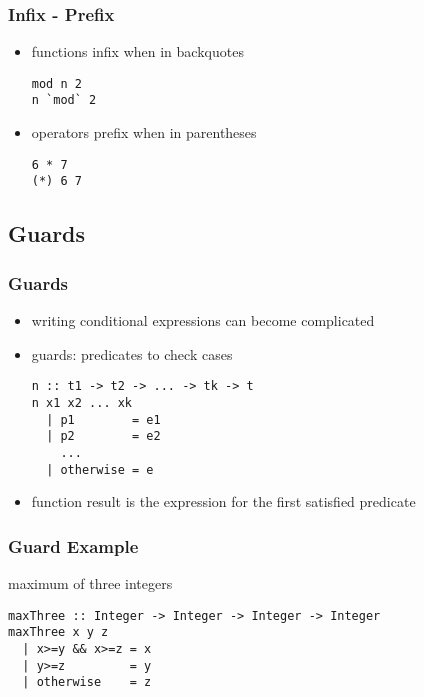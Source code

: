 \documentclass[dvipsnames]{beamer}
\theoremstyle{plain}
\begin{document}
\begin{frame}[fragile]
  \frametitle{Infix - Prefix}

  \begin{itemize}
    \item functions infix when in backquotes
    \begin{lstlisting}
mod n 2
n `mod` 2
    \end{lstlisting}

    \pause
    \medskip
    \item operators prefix when in parentheses
    \begin{lstlisting}
6 * 7
(*) 6 7
    \end{lstlisting}
  \end{itemize}
\end{frame}

\subsection{Guards}

\begin{frame}[fragile]
  \frametitle{Guards}

  \begin{itemize}
    \item writing conditional expressions can become complicated
    \item \alert{guards}: predicates to check cases

    \begin{lstlisting}[style=syntax]
n :: t1 -> t2 -> ... -> tk -> t
n x1 x2 ... xk
  | p1        = e1
  | p2        = e2
    ...
  | otherwise = e
    \end{lstlisting}

    \item function result is the expression for the first satisfied predicate
  \end{itemize}
\end{frame}

\begin{frame}[fragile]
  \frametitle{Guard Example}

  \begin{exampleblock}{maximum of three integers}
    \begin{lstlisting}
maxThree :: Integer -> Integer -> Integer -> Integer
maxThree x y z
  | x>=y && x>=z = x
  | y>=z         = y
  | otherwise    = z
    \end{lstlisting}
  \end{exampleblock}
\end{frame}
\end{document}
